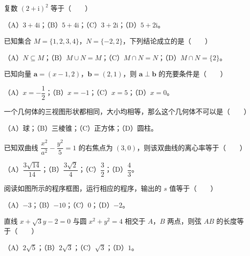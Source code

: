 \begin{question}
复数 $(2+\mathrm i)^2$ 等于\mbox{（　　）}

（A）$3+4\mathrm i$；（B）$5+4\mathrm i$；（C）$3+2\mathrm i$；（D）$5+2\mathrm i$。

\end{question}
\begin{question}
已知集合 $M=\{1,2,3,4\}$，$N=\{-2,2\}$，下列结论成立的是\mbox{（　　）}

（A）$N\subseteq M$；（B）$M\cup N=M$；（C）$M\cap N=N$；（D）$M\cap N=\{2\}$。

\end{question}
\begin{question}
已知向量 $\boldsymbol a=(x-1,2)$，$\boldsymbol b=(2,1)$，则 $\boldsymbol a\perp\boldsymbol b$ 的充要条件是\mbox{（　　）}

（A）$x=-\dfrac12$；（B）$x=-1$；（C）$x=5$；（D）$x=0$。

\end{question}
\begin{question}
一个几何体的三视图形状都相同，大小均相等，那么这个几何体不可以是\mbox{（　　）}

（A）球；（B）三棱锥；（C）正方体；（D）圆柱。

\end{question}
\begin{question}
已知双曲线 $\dfrac{x^2}{a^2}-\dfrac{y^2}{5}=1$ 的右焦点为 $(3,0)$，则该双曲线的离心率等于\mbox{（　　）}

（A）$\dfrac{3\sqrt{14}}{14}$；（B）$\dfrac{3\sqrt2}{4}$；（C）$\dfrac32$；（D）$\dfrac43$。

\Needspace{0.4\textheight}
\end{question}
\begin{question}
阅读如图所示的程序框图，运行相应的程序，输出的 $s$ 值等于\mbox{（　　）}
\nopagebreak[4]
\begin{center}\end{center}
\nopagebreak[4]
（A）$-3$；（B）$-10$；（C）$0$；（D）$-2$。

\end{question}
\begin{question}
直线 $x+\sqrt3y-2=0$ 与圆 $x^2+y^2=4$ 相交于 $A$，$B$ 两点，则弦 $AB$ 的长度等于\mbox{（　　）}

（A）$2\sqrt5$；（B）$2\sqrt3$；（C）$\sqrt3$；（D）$1$。

\end{question}

